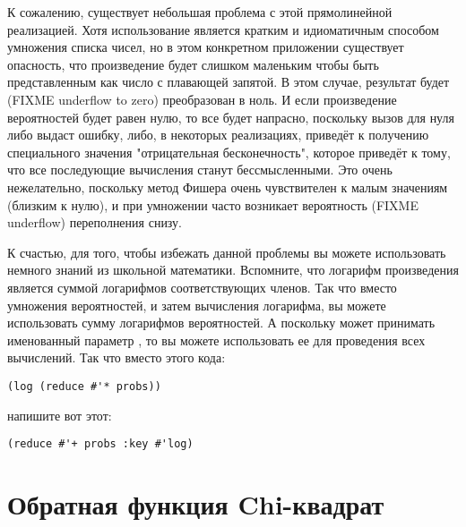 К сожалению, существует небольшая проблема с этой прямолинейной реализацией.  Хотя
использование  является кратким и идиоматичным способом умножения списка
чисел, но в этом конкретном приложении существует опасность, что произведение будет
слишком маленьким чтобы быть представленным как число с плавающей запятой. В этом случае,
результат будет (FIXME underflow to zero) преобразован в ноль.  И если произведение
вероятностей будет равен нулю, то все будет напрасно, поскольку вызов  для нуля
либо выдаст ошибку, либо, в некоторых реализациях, приведёт к получению специального
значения "отрицательная бесконечность", которое приведёт к тому, что все последующие
вычисления станут бессмысленными.  Это очень нежелательно, поскольку метод Фишера очень
чувствителен к малым значениям (близким к нулю), и при умножении часто возникает
вероятность (FIXME underflow) переполнения снизу.

К счастью, для того, чтобы избежать данной проблемы вы можете использовать немного знаний
из школьной математики.  Вспомните, что логарифм произведения является суммой логарифмов
соответствующих членов.  Так что вместо умножения вероятностей, и затем вычисления
логарифма, вы можете использовать сумму логарифмов вероятностей.  А поскольку
 может принимать именованный параметр , то вы можете использовать
ее для проведения всех вычислений.  Так что вместо этого кода:

\begin{lstlisting}
(log (reduce #'* probs))
\end{lstlisting}

напишите вот этот:

\begin{lstlisting}
(reduce #'+ probs :key #'log)
\end{lstlisting}

\section{Обратная функция Chi-квадрат}

